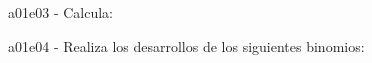 \documentclass[spanish, 11pt]{exam}
\begin{document}
\begin{questions}
\begin{multicols}{3}
\begin{parts}
        \end{parts}
        \end{multicols}
        \question a01e03 - Calcula:
        \begin{multicols}{3} 
        \end{multicols}
        \question a01e04 - Realiza los desarrollos de los siguientes binomios:
        \begin{multicols}{3} 

\end{multicols}
\end{questions}
\end{document}
